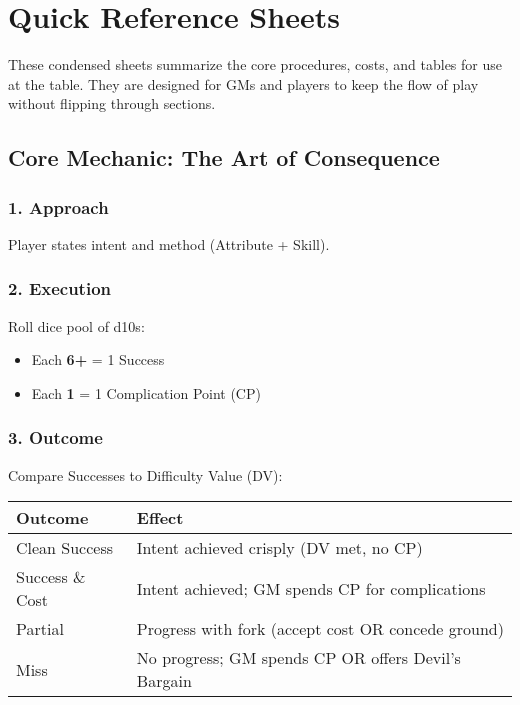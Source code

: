 
\chapter{Quick Reference Sheets}

These condensed sheets summarize the core procedures, costs, and tables for use at the table. They are designed for GMs and players to keep the flow of play without flipping through sections.

\section{Core Mechanic: The Art of Consequence}

\subsection*{1. Approach}
Player states intent and method (Attribute + Skill).

\subsection*{2. Execution}
Roll dice pool of d10s:
\begin{itemize}
  \item Each \textbf{6+} = 1 Success
  \item Each \textbf{1} = 1 Complication Point (CP)
\end{itemize}

\subsection*{3. Outcome}
Compare Successes to Difficulty Value (DV):

\begin{center}
\begin{tabular}{ll}
\toprule
\textbf{Outcome} & \textbf{Effect} \\
\midrule
Clean Success & Intent achieved crisply (DV met, no CP) \\
Success \& Cost & Intent achieved; GM spends CP for complications \\
Partial & Progress with fork (accept cost OR concede ground) \\
Miss & No progress; GM spends CP OR offers Devil's Bargain \\
\bottomrule
\end{tabular}
\end{center}


